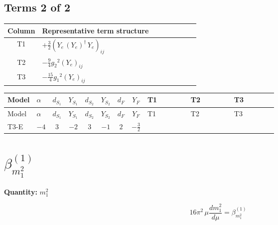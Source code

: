 \documentclass[8pt]{article}
\begin{document}
\begin{landscape}
\subsection*{Terms 2 of 2}
\begin{center}
\begin{tabular}{@{}c >{\raggedright\arraybackslash}p{0.82\linewidth}@{}}
\toprule
Column & Representative term structure \\
\midrule
T1 & \(\displaystyle +\frac{3}{2} \left({Y_e}\,\left({Y_e}\right)^{\dagger}\,{Y_e}\right)_{ij}\) \\
\midrule
T2 & \(\displaystyle -\frac{9}{4} {g_2}^2 \left({Y_e}\right)_{ij}\) \\
\midrule
T3 & \(\displaystyle -\frac{15}{4} {g_1}^2 \left({Y_e}\right)_{ij}\) \\
\midrule
\bottomrule
\end{tabular}
\end{center}
\smallskip
\tiny
\begin{longtable}{@{}llcccccc >{\raggedright\arraybackslash}p{0.21\linewidth} >{\raggedright\arraybackslash}p{0.21\linewidth} >{\raggedright\arraybackslash}p{0.21\linewidth}@{}}
\toprule
Model & $\alpha$ & $d_{S_1}$ & $Y_{S_1}$ & $d_{S_2}$ & $Y_{S_2}$ & $d_F$ & $Y_F$ & T1 & T2 & T3 \\
\midrule
\endfirsthead
\toprule
Model & $\alpha$ & $d_{S_1}$ & $Y_{S_1}$ & $d_{S_2}$ & $Y_{S_2}$ & $d_F$ & $Y_F$ & T1 & T2 & T3 \\
\midrule
\endhead
T3-E & $-4$ & $3$ & $-2$ & $3$ & $-1$ & $2$ & $-\frac{3}{2}$ & \scriptsize\adjustbox{max width=\linewidth}{$\begin{gathered} +\frac{3}{2} \left({Y_e}\,\left({Y_e}\right)^{\dagger}\,{Y_e}\right)_{ij}\end{gathered}$} & \scriptsize\adjustbox{max width=\linewidth}{$\begin{gathered} -\frac{9}{4} {g_2}^2 \left({Y_e}\right)_{ij}\end{gathered}$} & \scriptsize\adjustbox{max width=\linewidth}{$\begin{gathered} -\frac{15}{4} {g_1}^2 \left({Y_e}\right)_{ij}\end{gathered}$} \\
\midrule
\bottomrule
\end{longtable}
\clearpage
\section*{$\beta_{m_1^2}^{(1)}$}
\noindent\textbf{Quantity: }$m_1^2$\par\smallskip
\[16\pi^2\,\mu\frac{d m_1^2}{d\mu}=\beta_{m_1^2}^{(1)}\]

\end{landscape}
\end{document}
